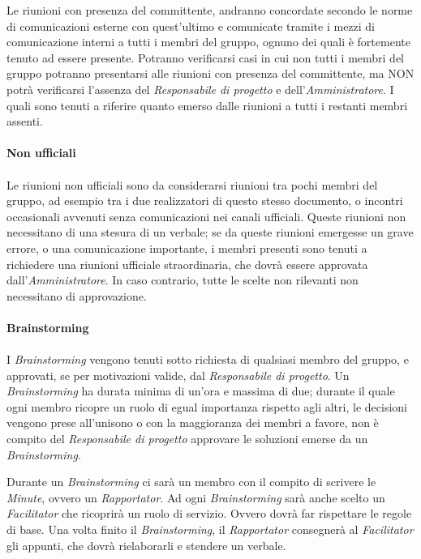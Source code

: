 \documentclass[a4paper]{report}
\begin{document}
		Le riunioni con presenza del committente, andranno concordate secondo le norme di comunicazioni esterne con quest'ultimo
		e comunicate tramite i mezzi di comunicazione interni a tutti i membri del gruppo, ognuno dei quali è fortemente tenuto ad
		essere presente. Potranno verificarsi casi in cui non tutti i membri del gruppo potranno presentarsi alle riunioni con 
		presenza del committente, ma NON potrà verificarsi l'assenza del \emph{Responsabile di progetto} e dell'\emph{Amministratore}.
		I quali sono tenuti a riferire quanto emerso dalle riunioni a tutti i restanti membri assenti. \\ \\
	\textbf{Non ufficiali} \\ \\
		Le riunioni non ufficiali sono da considerarsi riunioni tra pochi membri del gruppo, ad esempio tra i due realizzatori di questo
		stesso documento, o incontri occasionali avvenuti senza comunicazioni nei canali ufficiali. Queste riunioni non necessitano di 
		una stesura di un verbale; se da queste riunioni emergesse un grave errore, o una comunicazione importante, i membri presenti
		sono tenuti a richiedere una riunioni ufficiale straordinaria, che dovrà essere approvata dall'\emph{Amministratore}. In caso 
		contrario, tutte le scelte non rilevanti non necessitano di approvazione. \\ \\
	\textbf{Brainstorming} \\ \\
		I \emph{Brainstorming} vengono tenuti sotto richiesta di qualsiasi membro del gruppo, e approvati, se per motivazioni
		valide, dal \emph{Responsabile di progetto}. Un \emph{Brainstorming} ha durata minima di un'ora e massima di due; durante il quale
		ogni membro ricopre un ruolo di egual importanza rispetto agli altri, le decisioni vengono prese all'unisono o con la maggioranza 
		dei membri a favore, non è compito del \emph{Responsabile di progetto} approvare le soluzioni emerse da un \emph{Brainstorming}.
		
		Durante un \emph{Brainstorming} ci sarà un membro con il compito di scrivere le \emph{Minute}, ovvero un \emph{Rapportator}. 
		Ad ogni \emph{Brainstorming} sarà anche scelto un \emph{Facilitator} che ricoprirà un ruolo di servizio. Ovvero dovrà far 
		rispettare le regole di base. Una volta finito il \emph{Brainstorming}, il \emph{Rapportator} consegnerà al \emph{Facilitator}
		gli appunti, che dovrà rielaborarli e stendere un verbale.
	
	\cleardoublepage
	\listoffigures
	
	\cleardoublepage
	\listoftables
	
\end{document}
